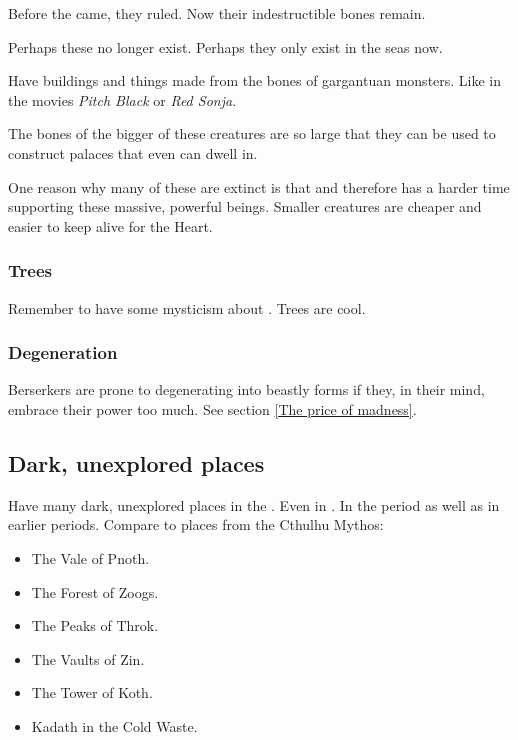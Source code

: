 Before the \ophidians{} came, they ruled. 
Now their indestructible bones remain. 

Perhaps these no longer exist. 
Perhaps they only exist in the seas now. 

Have buildings and things made from the bones of gargantuan monsters. 
Like in the movies \emph{Pitch Black} or \emph{Red Sonja}. 

The bones of the bigger of these creatures are so large that they can be used to construct palaces that even \dragons{} can dwell in. 

One reason why many of these are extinct is that  and therefore has a harder time supporting these massive, powerful beings. 
Smaller creatures are cheaper and easier to keep alive for the Heart. 





\subsubsection{Trees}
Remember to have some mysticism about . Trees are cool. 





\subsubsection{Degeneration}
Berserkers are prone to degenerating into beastly forms if they, in their mind, embrace their \Wylde{} power too much. See section \ref{The price of madness}. 









\subsection{Dark, unexplored places}
Have many dark, unexplored  places in the \wylde. 
Even in \Velcad. 
In the \thirdbanewar period as well as in earlier periods. 
Compare to places from the Cthulhu Mythos:

\begin{itemize}
  \item The Vale of Pnoth.
  \item The Forest of Zoogs.
  \item The Peaks of Throk.
  \item The Vaults of Zin.
  \item The Tower of Koth. 
  \item Kadath in the Cold Waste.
\end{itemize}

